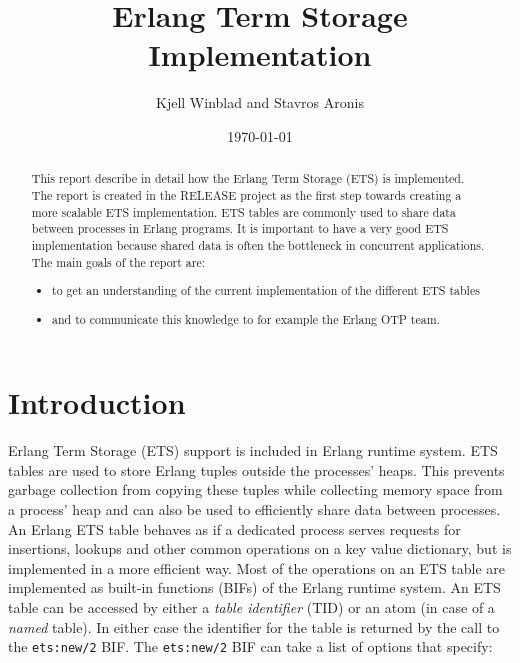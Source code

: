 \documentclass[aps,pre,preprint,nofootinbib]{revtex4}
\begin{document}
\title{Erlang Term Storage Implementation}
\author{Kjell Winblad and Stavros Aronis}
\date{\today}


\begin{abstract}

  This report describe in detail how the Erlang Term Storage (ETS) is implemented.
  The report is created in the RELEASE project as the first step towards creating a more scalable ETS implementation.
  ETS tables are commonly used to share data between processes in Erlang programs.
  It is important to have a very good ETS implementation because shared data is often the bottleneck in concurrent applications.
  The main goals of the report are:
  \begin{itemize}
   \item to get an understanding of the current implementation of the different ETS tables
   \item and to communicate this knowledge to for example the Erlang OTP team. 
  \end{itemize} 

\end{abstract}

\maketitle

\section{Introduction}

Erlang Term Storage (ETS) support is included in Erlang runtime system.
ETS tables are used to store Erlang tuples outside the processes' heaps.
This prevents garbage collection from copying these tuples while collecting memory space from a process' heap and can also be used to efficiently share data between processes. %
An Erlang ETS table behaves as if a dedicated process serves requests for insertions, lookups and other common operations on a key value dictionary, but is implemented in a more efficient way.
Most of the operations on an ETS table are implemented as built-in functions (BIFs) of the Erlang runtime system. 
An ETS table can be accessed by either a \emph{table identifier} (TID) or an atom (in case of a \emph{named} table).
In either case the identifier for the table is returned by the call to the \verb|ets:new/2| BIF.
The \verb|ets:new/2| BIF can take a list of options that specify: 
\end{document}
